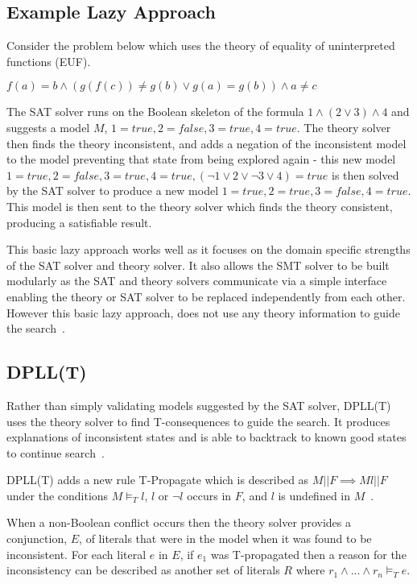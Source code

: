 \documentclass[]{final_report}
\begin{document}
\subsection{Example Lazy Approach}
Consider the problem below which uses the theory of equality of uninterpreted functions (EUF).

$ f(a) = b \land (g(f(c)) \neq g(b) \lor g(a) = g(b)) \land a \neq c $

The SAT solver runs on the Boolean skeleton of the formula $1 \land (2 \lor 3) \land 4$ and suggests a model $M$, $1 = \mathit{true}, 2 = \mathit{false}, 3 = \mathit{true}, 4 = \mathit{true}$. The theory solver then finds the theory inconsistent, and adds a negation of the inconsistent model to the model preventing that state from being explored again - this new model $ 1 = \mathit{true}, 2 = \mathit{false}, 3 = \mathit{true}, 4 = \mathit{true}, (\lnot 1 \lor 2 \lor \lnot 3 \lor 4 ) = true $ is then solved by the SAT solver to produce a new model $ 1 = \mathit{true}, 2 = \mathit{true}, 3 = \mathit{false}, 4 = \mathit{true}$. This model is then sent to the theory solver which finds the theory consistent, producing a satisfiable result.

This basic lazy approach works well as it focuses on the domain specific strengths of the SAT solver and theory solver. It also allows the SMT solver to be built modularly as the SAT and theory solvers communicate via a simple interface enabling the theory or SAT solver to be replaced independently from each other. However this basic lazy approach, does not use any theory information to guide the search~\cite{sattosmt}.

\subsection{DPLL(T)}
Rather than simply validating models suggested by the SAT solver, DPLL(T) uses the theory solver to find T-consequences to guide the search. It produces explanations of inconsistent states and is able to backtrack to known good states to continue search~\cite{smtdpplt, ganzinger2004dpll}.

DPLL(T) adds a new rule T-Propagate which is described as $M || F \implies M l || F $ under the conditions $M \models _T l$, $l$ or $\lnot l$ occurs in $F$, and $l$ is undefined in $M$~\cite{sattosmt}.

When a non-Boolean conflict occurs then the theory solver provides a conjunction, $E$, of literals that were in the model when it was found to be inconsistent. For each literal $e $ in $E$, if $e_1$ was T-propagated then a reason for the inconsistency can be described as another set of literals $R$ where $r_1 \land ... \land r_n \models _T e$. 
\end{document}
